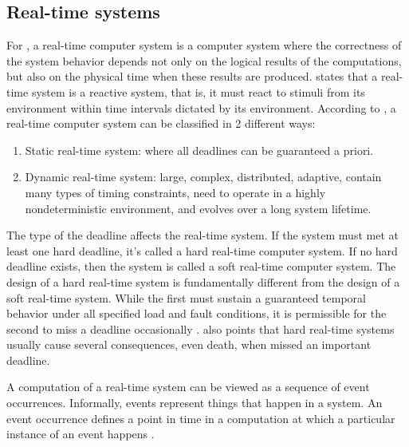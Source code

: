 \documentclass[12pt]{article}
\begin{document}
\subsection{Real-time systems}


For \cite{kopetz2011real}, a real-time computer system is a computer system where the correctness 
of the system behavior depends not only on the logical results of the computations, but also on 
the physical time when these results are produced. \cite{lichtenstein1985glory} states that a real-time system 
is a reactive system, that is, it must react to stimuli from its environment within time intervals dictated by 
its environment. According to \cite{stankovic1990predictability}, a real-time computer system can be classified 
in 2 different ways:
\begin{enumerate}
 \item Static real-time system: where all deadlines can be guaranteed a priori.
 \item Dynamic real-time system: large, complex, distributed, adaptive, contain many types of timing constraints, 
need to operate in a highly nondeterministic environment, and evolves over a long system lifetime.
\end{enumerate}

The type of the deadline affects the real-time system. If the system must met at least
one hard deadline, it's called a hard real-time computer system.  If no hard deadline exists, 
then the system is called a soft real-time computer system. The design of a hard real-time system is 
fundamentally different from the design of a soft real-time system. While the first must sustain a guaranteed 
temporal behavior under all specified load and fault conditions, it is permissible for the second to miss a 
deadline occasionally \cite{kopetz2011real}. \cite{stankovic1996real} also points that hard real-time systems 
usually cause several consequences, even death, when missed an important deadline.

A computation of a real-time system can be viewed as a sequence of event occurrences. Informally, 
events represent things that happen in a system. An event occurrence defines a point in time in a
computation at which a particular instance of an event happens \cite{chodrow1991run}.
\end{document}
